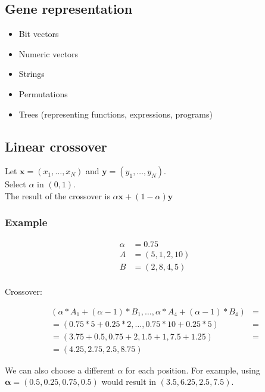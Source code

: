 \documentclass{article}
\begin{document}
    \subsection{Gene representation}
    \begin{itemize}
        \item Bit vectors
        \item Numeric vectors
        \item Strings
        \item Permutations
        \item Trees (representing functions, expressions, programs)
    \end{itemize}

    \subsection{Linear crossover}
    Let $\mathbf{x} = (x_1, \ldots, x_N)$ and $\mathbf{y} = (y_1, \ldots, y_N)$. \\
    Select $\alpha$ in $(0, 1)$. \\
    The result of the crossover is $\alpha \mathbf{x} + (1 - \alpha) \mathbf{y}$

        \subsubsection{Example}
        \begin{align*}
            \alpha &= 0.75 \\
            A &= (5, 1, 2, 10) \\
            B &= (2, 8, 4, 5) \\
        \end{align*}

        Crossover:

        \begin{align*}
            (\alpha * A_1 + (\alpha - 1) * B_1, \ldots, \alpha * A_4 + (\alpha - 1) * B_4) &= \\
            = (0.75 * 5 + 0.25 * 2, \ldots, 0.75 * 10 + 0.25 * 5) &= \\
            = (3.75 + 0.5, 0.75 + 2, 1.5 + 1, 7.5 + 1.25) &= \\
            = (4.25, 2.75, 2.5, 8.75)
        \end{align*}

        We can also choose a different $\alpha$ for each position. For example, using $\mathbf{\alpha} = (0.5, 0.25, 0.75, 0.5)$ would result in $(3.5, 6.25, 2.5, 7.5)$.
\end{document}
